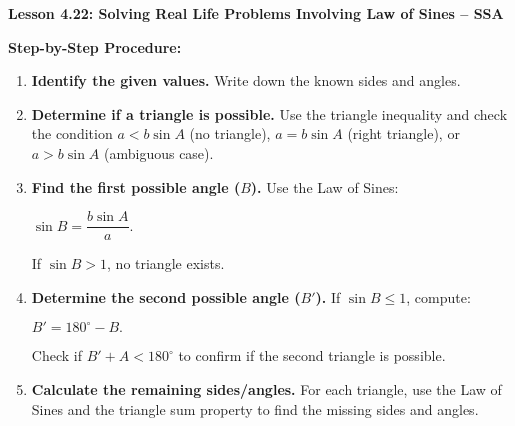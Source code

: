 \begin{center}
\textbf{Lesson 4.22: Solving Real Life Problems Involving Law of Sines -- SSA}
\end{center}

\vspace*{-1.5ex}

\noindent\textbf{Step-by-Step Procedure:}
\begin{enumerate}
    \item \textbf{Identify the given values.} Write down the known sides and angles.
    \item \textbf{Determine if a triangle is possible.} Use the triangle inequality and check the condition \(a < b \sin A\) (no triangle), \(a = b \sin A\) (right triangle), or \(a > b \sin A\) (ambiguous case).
    \item \textbf{Find the first possible angle (\(B\)).} Use the Law of Sines:

{\centering $
    \sin B = \dfrac{b \sin A}{a}.
$\par}

\noindent If \(\sin B > 1\), no triangle exists.
    \item \textbf{Determine the second possible angle (\(B'\)).} If \(\sin B \leq 1\), compute:

{\centering $
    B' = 180^\circ - B.
$\par}

\noindent Check if \(B' + A < 180^\circ\) to confirm if the second triangle is possible.
    \item \textbf{Calculate the remaining sides/angles.} For each triangle, use the Law of Sines and the triangle sum property to find the missing sides and angles.
\end{enumerate}
